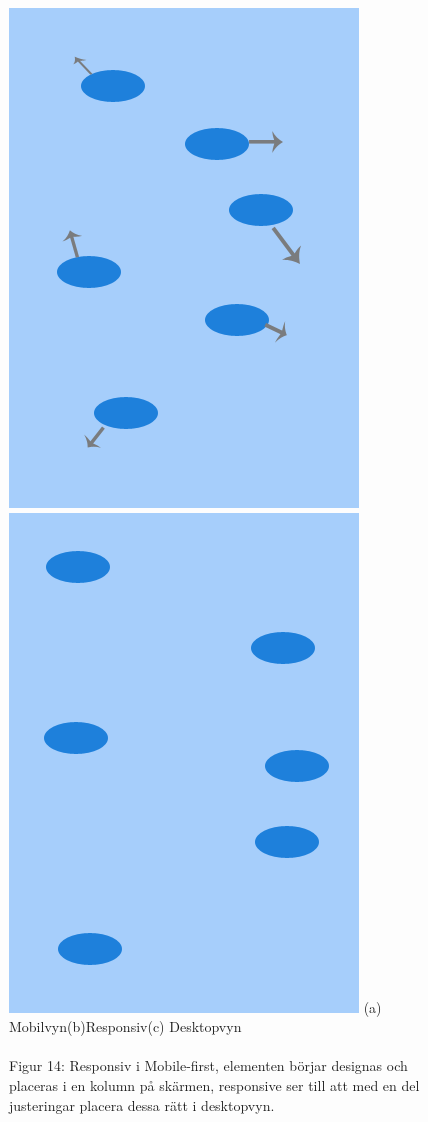\documentclass[11pt]{article}
\begin{document}
\begin{figure}[H]
{\includegraphics[scale=0.3]{pics/responsiv.png}\hspace{2em}%
\includegraphics[scale=0.3]{pics/desktop.png}%
}
\hspace{2cm}(a) Mobilvyn\hspace{2.3cm}(b)Responsiv\hspace{2.1cm}(c) Desktopvyn
\\\\
\hspace{0.15cm}Figur 14: Responsiv i Mobile-first, elementen börjar designas och placeras i en kolumn på skärmen, responsive ser till att med en del justeringar placera dessa rätt i desktopvyn.
\end{figure}
\end{document}
